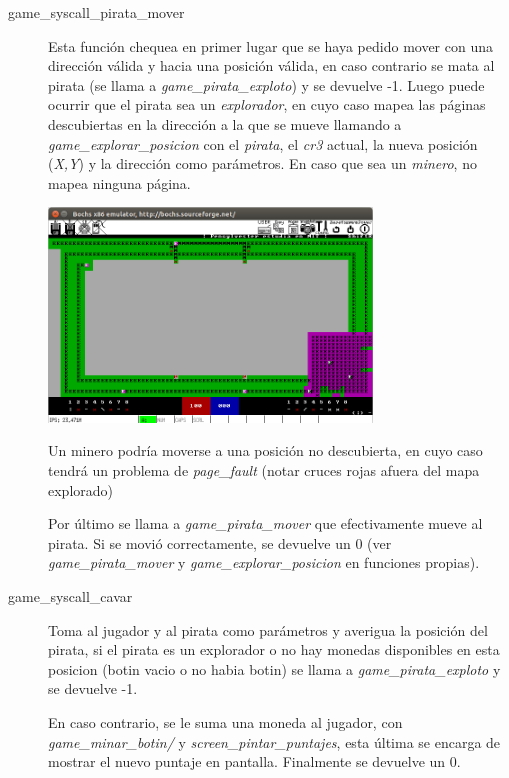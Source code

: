 \begin{description}
\item[game_syscall_pirata_mover] Esta función chequea en primer lugar que se
haya pedido mover con una dirección válida y hacia una posición válida, en caso
contrario se mata al pirata (se llama a {\it game_pirata_exploto\/}) y se
devuelve -1. Luego puede ocurrir que el pirata sea un {\it explorador\/}, en
cuyo caso mapea las páginas descubiertas en la dirección a la que se mueve
llamando a {\it game_explorar_posicion\/} con el {\it pirata\/}, el {\it cr3\/}
actual, la nueva posición ({\it X,Y\/}) y la dirección como parámetros. En caso
que sea un {\it minero\/}, no mapea ninguna página.

\begin{center}
\includegraphics[width=0.7\textwidth]{imagenes/mapa4.png}

Un minero podría
moverse a una posición no descubierta, en cuyo caso tendrá un problema de
{\it page_fault\/} (notar cruces rojas afuera del mapa explorado)
\end{center}

Por último se llama a {\it game_pirata_mover\/} que efectivamente mueve al
pirata. Si se movió correctamente, se devuelve un 0 (ver
{\it game_pirata_mover\/} y {\it game_explorar_posicion\/} en funciones
propias).

\item[game_syscall_cavar] Toma al jugador y al pirata como parámetros y averigua
la posición del pirata, si el pirata es un explorador o no hay monedas
disponibles en esta posicion (botin vacio o no habia botin) se llama a
{\it game_pirata_exploto\/} y se devuelve -1.

En caso contrario, se le suma una moneda al jugador, con {\it game_minar_botin/}
y {\it screen_pintar_puntajes\/}, esta última se encarga de mostrar el nuevo
puntaje en pantalla. Finalmente se devuelve un 0.


\end{description}
